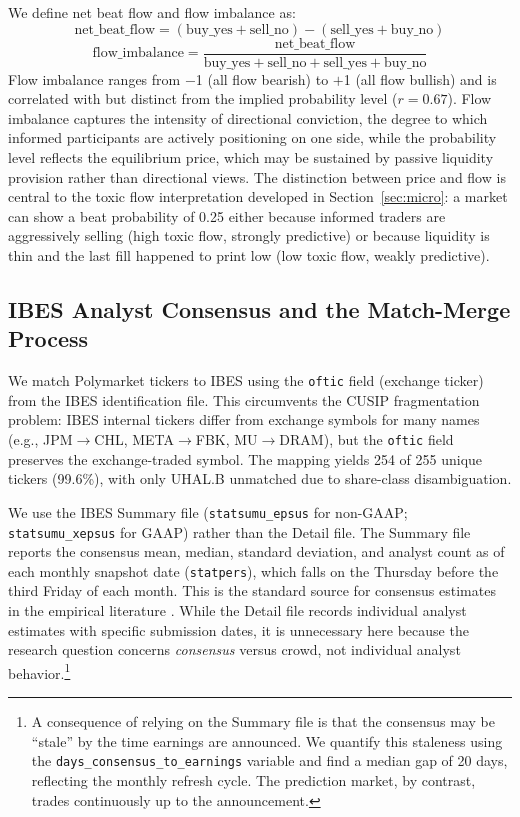 \documentclass[11pt]{article}
\begin{document}
We define net beat flow and flow imbalance as:
\begin{equation}
\text{net\_beat\_flow} = (\text{buy\_yes} + \text{sell\_no}) - (\text{sell\_yes} + \text{buy\_no})
\end{equation}
\begin{equation}
\text{flow\_imbalance} = \frac{\text{net\_beat\_flow}}{\text{buy\_yes} + \text{sell\_no} + \text{sell\_yes} + \text{buy\_no}}
\end{equation}
Flow imbalance ranges from $-$1 (all flow bearish) to $+$1 (all flow bullish) and is correlated with but distinct from the implied probability level ($r = 0.67$). Flow imbalance captures the intensity of directional conviction, the degree to which informed participants are actively positioning on one side, while the probability level reflects the equilibrium price, which may be sustained by passive liquidity provision rather than directional views. The distinction between price and flow is central to the toxic flow interpretation developed in Section~\ref{sec:micro}: a market can show a beat probability of 0.25 either because informed traders are aggressively selling (high toxic flow, strongly predictive) or because liquidity is thin and the last fill happened to print low (low toxic flow, weakly predictive).

\subsection{IBES Analyst Consensus and the Match-Merge Process}

We match Polymarket tickers to IBES using the \texttt{oftic} field (exchange ticker) from the IBES identification file. This circumvents the CUSIP fragmentation problem: IBES internal tickers differ from exchange symbols for many names (e.g., JPM$\to$CHL, META$\to$FBK, MU$\to$DRAM), but the \texttt{oftic} field preserves the exchange-traded symbol. The mapping yields 254 of 255 unique tickers (99.6\%), with only UHAL.B unmatched due to share-class disambiguation.

We use the IBES Summary file (\texttt{statsumu\_epsus} for non-GAAP; \texttt{statsumu\_xepsus} for GAAP) rather than the Detail file. The Summary file reports the consensus mean, median, standard deviation, and analyst count as of each monthly snapshot date (\texttt{statpers}), which falls on the Thursday before the third Friday of each month. This is the standard source for consensus estimates in the empirical literature \citep{richardson2004walk, matsumoto2002management}. While the Detail file records individual analyst estimates with specific submission dates, it is unnecessary here because the research question concerns \textit{consensus} versus crowd, not individual analyst behavior.\footnote{A consequence of relying on the Summary file is that the consensus may be ``stale'' by the time earnings are announced. We quantify this staleness using the \texttt{days\_consensus\_to\_earnings} variable and find a median gap of 20 days, reflecting the monthly refresh cycle. The prediction market, by contrast, trades continuously up to the announcement.}
\end{document}
